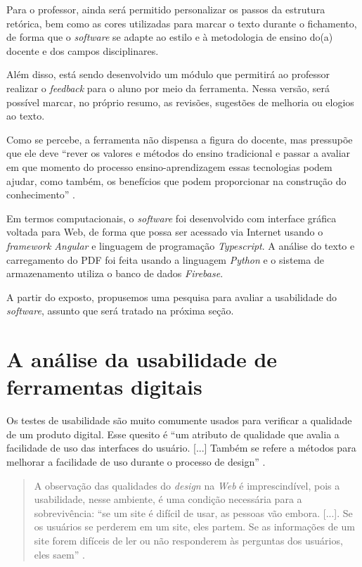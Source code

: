 \documentclass[portuguese]{textolivre}
\begin{document}
Para o professor, ainda será permitido personalizar os passos da estrutura retórica, bem como as cores utilizadas para marcar o texto durante o fichamento, de forma que o \textit{software} se adapte ao estilo e à metodologia de ensino do(a) docente e dos campos disciplinares.

Além disso, está sendo desenvolvido um módulo que permitirá ao professor realizar o \textit{feedback} para o aluno por meio da ferramenta. Nessa versão, será possível marcar, no próprio resumo, as revisões, sugestões de melhoria ou elogios ao texto.

Como se percebe, a ferramenta não dispensa a figura do docente, mas pressupõe que ele deve “rever os valores e métodos do ensino tradicional e passar a avaliar em que momento do processo ensino-aprendizagem essas tecnologias podem ajudar, como também, os benefícios que podem proporcionar na construção do conhecimento” \cite[p.~23]{juca2006}.

Em termos computacionais, o \textit{software} foi desenvolvido com interface gráfica voltada para Web, de forma que possa ser acessado via Internet usando o \textit{framework Angular} e linguagem de programação \textit{Typescript}. A análise do texto e carregamento do PDF foi feita usando a linguagem \textit{Python} e o sistema de armazenamento utiliza o banco de dados \textit{Firebase}.

A partir do exposto, propusemos uma pesquisa para avaliar a usabilidade do \textit{software}, assunto que será tratado na próxima seção.


\section{A análise da usabilidade de ferramentas digitais}\label{sec-formato}
Os testes de usabilidade são muito comumente usados para verificar a qualidade de um produto digital. Esse quesito é “um atributo de qualidade que avalia a facilidade de uso das interfaces do usuário. [...] Também se refere a métodos para melhorar a facilidade de uso durante o processo de design” \cite[p.~1, tradução nossa]{nielsen2012}.

\begin{quote}
    A observação das qualidades do \textit{design} na \textit{Web} é imprescindível, pois a usabilidade, nesse ambiente, é uma condição necessária para a sobrevivência: “se um site é difícil de usar, as pessoas vão embora. [...]. Se os usuários se perderem em um site, eles partem. Se as informações de um site forem difíceis de ler ou não responderem às perguntas dos usuários, eles saem” \cite[p.~2]{nielsen2012}.
\end{quote}
	
\end{document}
